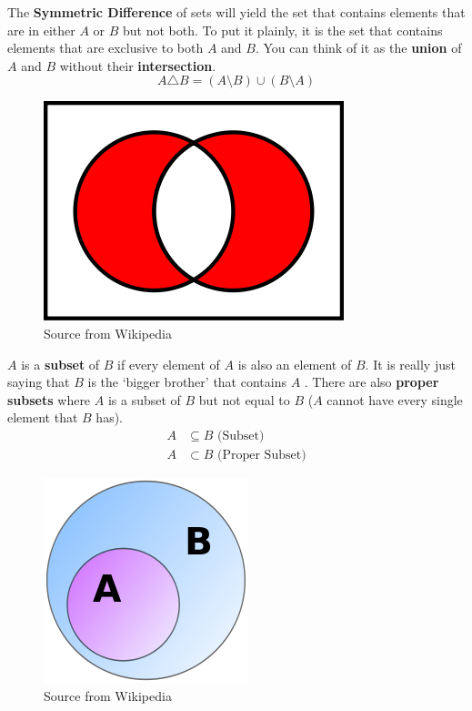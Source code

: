 \documentclass[../setup.tex]{subfiles}
\begin{document}
\begin{theorem}
The \textbf{Symmetric Difference} of sets will yield the set that contains elements that are in either $A$ or $B$ but not both. To put it plainly, it is the set that contains elements that are exclusive to both $A$ and $B$. You can think of it as the \textbf{union} of $A$ and $B$ without their \textbf{intersection}.
\[A \triangle B = (A\setminus B) \cup (B\setminus A)\]
\begin{figure}[H]
    \centering
    \includegraphics[scale=0.6]{Venn Diagram-SymmetricDifference.png}
    \caption{Source from Wikipedia}
\end{figure}
\end{theorem}

\begin{theorem}[Subset]
$A$ is a \textbf{subset} of $B$ if every element of $A$ is also an element of $B$. It is really just saying that $B$ is the `bigger brother' that contains $A$ . There are also \textbf{proper subsets} where $A$ is a subset of $B$ but not equal to $B$ ($A$ cannot have every single element that $B$ has).
\begin{align*}
A &\subseteq B \text{\ \ \ \ (Subset)} \\
A &\subset B \text{\ \ \ \ (Proper Subset)}
\end{align*}
\begin{figure}[H]
    \centering
    \includegraphics[scale=0.6]{Venn Diagram-ProperSubset.png}
    \caption{Source from Wikipedia}
\end{figure}
\end{theorem}
\end{document}
